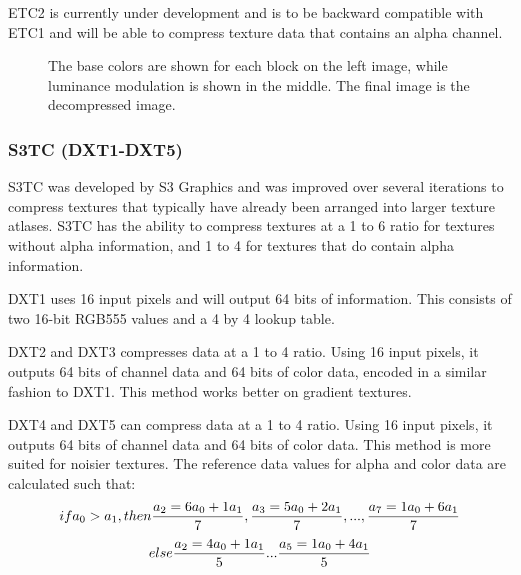 \documentclass[12pt]{CPP}
\begin{document}
ETC2 is currently under development and is to be backward compatible with ETC1 and will be able to compress texture data that contains an alpha channel. \citep{Strom2005}

\begin{figure}[!htbp]
\begin{center}
\caption{The base colors are shown for each block on the left image, while luminance modulation is shown in the middle. The final image is the decompressed image.}
\end{center}
\end{figure}

\subsubsection{S3TC (DXT1-DXT5)}
S3TC was developed by S3 Graphics and was improved over several iterations to compress textures that typically have already been arranged into larger texture atlases. S3TC has the ability to compress textures at a 1 to 6 ratio for textures without alpha information, and 1 to 4 for textures that do contain alpha information.

DXT1 uses 16 input pixels and will output 64 bits of information. This consists of two 16-bit RGB555 values and a 4 by 4 lookup table.

DXT2 and DXT3 compresses data at a 1 to 4 ratio. Using 16 input pixels, it outputs 64 bits of channel data and 64 bits of color data, encoded in a similar fashion to DXT1. This method works better on gradient textures.

DXT4 and DXT5 can compress data at a 1 to 4 ratio. Using 16 input pixels, it outputs 64 bits of channel data and 64 bits of color data. This method is more suited for noisier textures. The reference data values for alpha and color data are calculated such that:
\[
if a_0 > a_1, then  {a_2 = 6a_0+1a_1\over7},{a_3 = 5a_0+2a_1\over7},... ,{a_7 = 1a_0+6a_1\over7}
\]
\[
else {a_2 = 4a_0+1a_1\over5}...{a_5 = 1a_0+4a_1\over5}
\]
\end{document}
